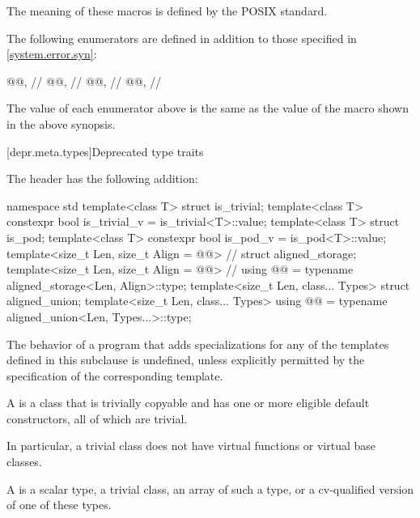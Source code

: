 \pnum
The meaning of these macros is defined by the POSIX standard.

\pnum
The following  enumerators are defined
in addition to those specified in \ref{system.error.syn}:

\begin{codeblock}
@@,               // 
@@,                // 
@@,                       // 
@@,                     // 
\end{codeblock}

\pnum
The value of each  enumerator above
is the same as the value of the  macro
shown in the above synopsis.

[depr.meta.types]{Deprecated type traits}

\pnum
The header 
has the following addition:

\begin{codeblock}
namespace std {
  template<class T> struct is_trivial;
  template<class T> constexpr bool is_trivial_v = is_trivial<T>::value;
  template<class T> struct is_pod;
  template<class T> constexpr bool is_pod_v = is_pod<T>::value;
  template<size_t Len, size_t Align = @@> // \seebelow
    struct aligned_storage;
  template<size_t Len, size_t Align = @@> // \seebelow
    using @@ = typename aligned_storage<Len, Align>::type;
  template<size_t Len, class... Types>
    struct aligned_union;
  template<size_t Len, class... Types>
    using @@ = typename aligned_union<Len, Types...>::type;
}
\end{codeblock}

\pnum
The behavior of a program that adds specializations for
any of the templates defined in this subclause is undefined,
unless explicitly permitted by the specification of the corresponding template.

\pnum
\label{term.trivial.type}%
A  is a class that is trivially copyable and
has one or more eligible default constructors, all of which are trivial.
\begin{note}
In particular,
a trivial class does not have virtual functions or virtual base classes.
\end{note}
A  is a scalar type, a trivial class,
an array of such a type, or a cv-qualified version of one of these types.

